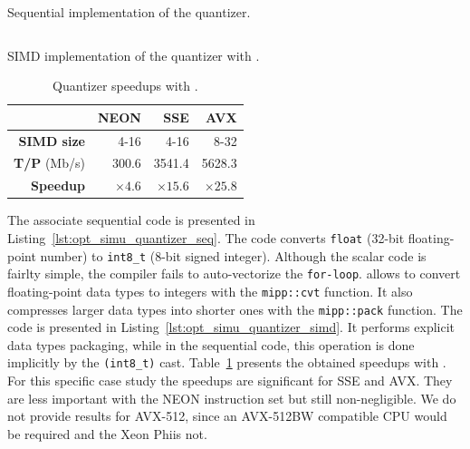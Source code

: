 \begin{listing}[htp]
  \inputminted[frame=lines,linenos]{C++}{main/chapter3/src/simu/quantizer/quantizer_seq.cpp}
  \caption{Sequential implementation of the quantizer.}
  \label{lst:opt_simu_quantizer_seq}
\end{listing}

\begin{listing}[htp]
  \inputminted[frame=lines,linenos]{C++}{main/chapter3/src/simu/quantizer/quantizer_simd.cpp}
  \caption{SIMD implementation of the quantizer with \MIPP.}
  \label{lst:opt_simu_quantizer_simd}
\end{listing}

\begin{table}[htp]
  \centering
  \caption{Quantizer speedups with \MIPP.}
  \label{tab:opt_simu_quantizer_speedup}
  \begin{tabular}{r | r  r r}
                      & \textbf{NEON} & \textbf{SSE}  & \textbf{AVX}  \\ \hline \hline
  \textbf{SIMD size}  & 4-16          & 4-16          & 8-32          \\ %
  \textbf{T/P} (Mb/s) & 300.6         & 3541.4        & 5628.3        \\ %
  \textbf{Speedup}    & $\times 4.6$  & $\times 15.6$ & $\times 25.8$ \\
  \end{tabular}
\end{table}

The associate sequential code is presented in
Listing~\ref{lst:opt_simu_quantizer_seq}. The code converts \verb|float| (32-bit
floating-point number) to \verb|int8_t| (8-bit signed integer). Although the
scalar code is fairlty simple, the compiler fails to auto-vectorize the
\verb|for-loop|. \MIPP allows to convert floating-point data types to integers
with the \verb|mipp::cvt| function. It also compresses larger data types into
shorter ones with the \verb|mipp::pack| function. The \MIPP code is presented in
Listing~\ref{lst:opt_simu_quantizer_simd}. It performs explicit data types
packaging, while in the sequential code, this operation is done implicitly by
the \verb|(int8_t)| cast. Table~\ref{tab:opt_simu_quantizer_speedup} presents
the obtained speedups with \MIPP. For this specific case study the speedups are
significant for SSE and AVX. They are less important with the NEON instruction
set but still non-negligible. We do not provide results for AVX-512, since an
AVX-512BW compatible CPU would be required and the Xeon Phi\TM is not.

